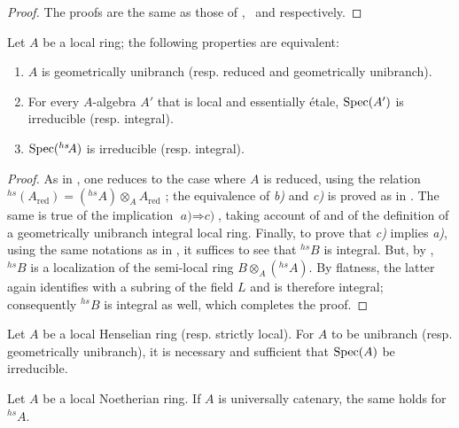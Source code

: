 \begin{proof}
The proofs are the same as those of ,~ and  respectively.
\end{proof}

\begin{proposition}[18.8.15]
\label{IV.18.8.15}
Let $A$ be a local ring;
the following properties are equivalent:
\begin{enumerate}[label=\emph{\alph*)}]
  \item $A$ is geometrically unibranch \textup{(resp.} reduced and geometrically unibranch\textup{)}.
  \item For every $A$-algebra $A'$ that is local and essentially \'{e}tale, $\operatorname{Spec}(A')$ is irreducible \textup{(resp.} integral\textup{)}.
  \item $\operatorname{Spec}({}^{hs}\!A)$ is irreducible \textup{(resp.} integral\textup{)}.
\end{enumerate}
\end{proposition}

\begin{proof}
As in , one reduces to the case where $A$ is reduced, using the relation ${}^{hs}(A_{\mathrm{red}})=({}^{hs}\!A)\otimes_{A}A_{\mathrm{red}}$ ; the equivalence of \emph{b)} and \emph{c)} is proved as in .  The same is true of the implication $\textit{a)}\Rightarrow\textit{c)}$, taking account of  and of the definition of a geometrically unibranch integral local ring.
Finally, to prove that \emph{c)} implies \emph{a)}, using the same notations as in , it suffices to see that ${}^{hs}\!B$ is integral.
But, by , ${}^{hs}\!B$ is a localization of the semi-local ring $B\otimes_{A}({}^{hs}\!A)$.  By flatness, the latter again identifies with a subring of the field $L$ and is therefore integral; consequently ${}^{hs}\!B$ is integral as well, which completes the proof.
\end{proof}

\begin{corollary}[18.8.16]
\label{IV.18.8.16}
Let $A$ be a local Henselian ring \textup{(resp.} strictly local\textup{)}.
For $A$ to be unibranch \textup{(resp.} geometrically unibranch\textup{)}, it is necessary and sufficient that $\operatorname{Spec}(A)$ be irreducible.
\end{corollary}


\begin{proposition}[18.8.17]
\label{IV.18.8.17}
Let $A$ be a local Noetherian ring.
If $A$ is universally catenary, the same holds for ${}^{hs}\!A$.
\end{proposition}

